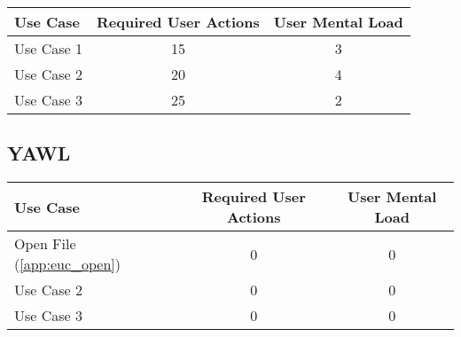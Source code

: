 


\begin{tabularx}{\textwidth}{Xcc}
\textbf{Use Case} & \textbf{Required User Actions} & \textbf{User Mental Load}\\
\hline
Use Case 1                          & 15 & 3 \\
Use Case 2                          & 20 & 4 \\
Use Case 3                          & 25 & 2
\end{tabularx}

\subsection{YAWL}

\begin{tabularx}{\textwidth}{Xcc}
\textbf{Use Case} & \textbf{Required User Actions} & \textbf{User Mental Load}\\
\hline
Open File (\ref{app:euc_open}) & 0 & 0 \\
Use Case 2                     & 0 & 0 \\
Use Case 3                     & 0 & 0
\end{tabularx}
